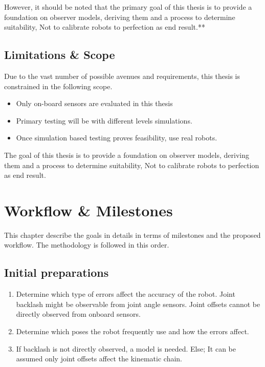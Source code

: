 \documentclass[english, printversion, nomenclature, notitle]{tuvisionthesis} %
\begin{document}
However, it should be noted that the primary goal of this thesis is to provide a foundation on observer models, deriving them and a process to determine suitability, Not to calibrate robots to perfection as end result.**

\section{Limitations \& Scope}

Due to the vast number of possible avenues and requirements, this thesis is constrained in the following scope.

\begin{itemize}
	\item Only on-board sensors are evaluated in this thesis
	\item Primary testing will be with different levels simulations.
	\item Once simulation based testing proves feasibility, use real robots.
\end{itemize}

The goal of this thesis is to provide a foundation on observer models, deriving them and a process to determine suitability, Not to calibrate robots to perfection as end result.

\chapter{Workflow \& Milestones}
This chapter describe the goals in details in terms of milestones and the proposed workflow.  The methodology  is followed in this order.

\section{Initial preparations}

\begin{enumerate}
	\item Determine which type of errors affect the accuracy of the robot.
	\subitem Joint backlash might be observable from joint angle sensors.
	\subitem Joint offsets cannot be directly observed from onboard sensors.
	\item Determine which poses the robot frequently use and how the errors affect.
	\item If backlash is not directly observed, a model is needed.
	\subitem Else; It can be assumed only joint offsets affect the kinematic chain.
\end{enumerate}
\end{document}

